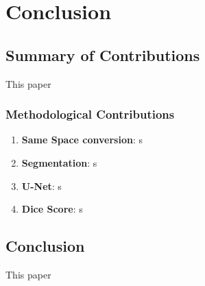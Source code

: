 \chapter{Conclusion}

\section{Summary of Contributions}

This paper 

\subsection{Methodological Contributions}

\begin{enumerate}
\item \textbf{Same Space conversion}: s

\item \textbf{Segmentation}: s

\item \textbf{U-Net}: s

\item \textbf{Dice Score}: s
\end{enumerate}

\section{Conclusion}

This paper 